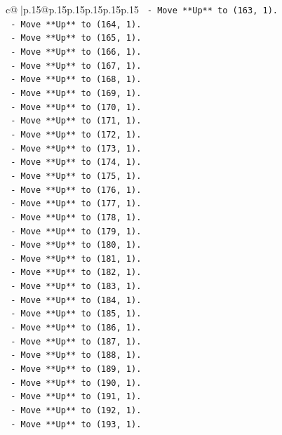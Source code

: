 \documentclass{article}
\begin{document}
{\begin{supertabular}{c@{$\;$}|p{.15\linewidth}@{}p{.15\linewidth}p{.15\linewidth}p{.15\linewidth}p{.15\linewidth}p{.15\linewidth}}
{{{\texttt{    {-} Move **Up** to (163, 1).} \\
\texttt{    {-} Move **Up** to (164, 1).} \\
\texttt{    {-} Move **Up** to (165, 1).} \\
\texttt{    {-} Move **Up** to (166, 1).} \\
\texttt{    {-} Move **Up** to (167, 1).} \\
\texttt{    {-} Move **Up** to (168, 1).} \\
\texttt{    {-} Move **Up** to (169, 1).} \\
\texttt{    {-} Move **Up** to (170, 1).} \\
\texttt{    {-} Move **Up** to (171, 1).} \\
\texttt{    {-} Move **Up** to (172, 1).} \\
\texttt{    {-} Move **Up** to (173, 1).} \\
\texttt{    {-} Move **Up** to (174, 1).} \\
\texttt{    {-} Move **Up** to (175, 1).} \\
\texttt{    {-} Move **Up** to (176, 1).} \\
\texttt{    {-} Move **Up** to (177, 1).} \\
\texttt{    {-} Move **Up** to (178, 1).} \\
\texttt{    {-} Move **Up** to (179, 1).} \\
\texttt{    {-} Move **Up** to (180, 1).} \\
\texttt{    {-} Move **Up** to (181, 1).} \\
\texttt{    {-} Move **Up** to (182, 1).} \\
\texttt{    {-} Move **Up** to (183, 1).} \\
\texttt{    {-} Move **Up** to (184, 1).} \\
\texttt{    {-} Move **Up** to (185, 1).} \\
\texttt{    {-} Move **Up** to (186, 1).} \\
\texttt{    {-} Move **Up** to (187, 1).} \\
\texttt{    {-} Move **Up** to (188, 1).} \\
\texttt{    {-} Move **Up** to (189, 1).} \\
\texttt{    {-} Move **Up** to (190, 1).} \\
\texttt{    {-} Move **Up** to (191, 1).} \\
\texttt{    {-} Move **Up** to (192, 1).} \\
\texttt{    {-} Move **Up** to (193, 1).} \\
}}}
\end{supertabular}}
\end{document}
